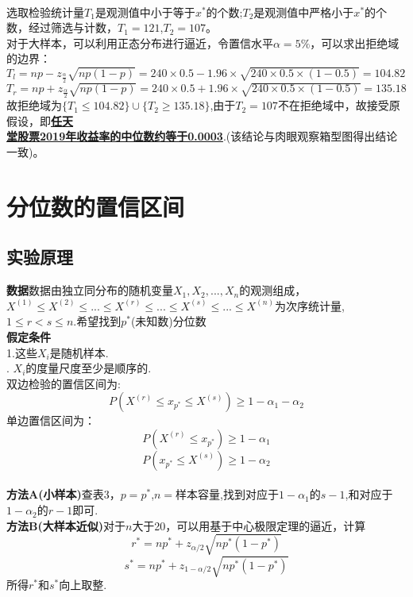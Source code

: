 \documentclass[a4paper, 11pt]{article}
\begin{document}
	\\\indent 选取检验统计量$T_{1}$是观测值中小于等于$x^{*}$的个数;$T_{2}$是观测值中严格小于$x^{*}$的个数，经过筛选与计数，$T_{1}=121$,$T_{2}=107$。
	\\\indent 对于大样本，可以利用正态分布进行逼近，令置信水平$\alpha=5\%$，可以求出拒绝域的边界：
	\\$T_{l}=np-z_{\frac{\alpha}{2}}\sqrt{np(1-p)}=240\times0.5-1.96\times\sqrt{240\times0.5\times(1-0.5)}=104.82$
	\\$T_{r}=np+z_{\frac{\alpha}{2}}\sqrt{np(1-p)}=240\times0.5+1.96\times\sqrt{240\times0.5\times(1-0.5)}=135.18$
	\\故拒绝域为$\{T_{1}\leq 104.82\}\cup\{T_{2}\geq 135.18\}$,由于$T_{2}=107$不在拒绝域中，故接受原假设，即\textbf{\underline{任天}}\\\textbf{\underline{堂股票2019年收益率的中位数约等于0.0003}}.(该结论与肉眼观察箱型图得出结论一致)。
	
	\section{分位数的置信区间}
	\subsection{实验原理}
	\noindent\textbf{数据}\quad 数据由独立同分布的随机变量$X_{1},X_{2},...,X_{n}$的观测组成，$X^{(1)}\leq X^{(2)}\leq ...\leq X^{(r)}\leq ...\leq X^{(s)}\leq ...\leq X^{(n)}$为次序统计量,$1\leq r<s\leq n$.希望找到$p^{*}$(未知数)分位数\\
	\textbf{假定条件}\\
	\indent1.这些$X_{i}$是随机样本.\\
	.\; $X_{i}$的度量尺度至少是顺序的.\\
	双边检验的置信区间为:
	$$P(X^{(r)}\leq x_{p^{*}}\leq X^{(s)})\geq 1-\alpha_{1}-\alpha_{2}$$
	单边置信区间为：
	$$P(X^{(r)}\leq x_{p^{*}})\geq 1-\alpha_{1}$$
	$$P(x_{p^{*}}\leq X^{(s)})\geq 1-\alpha_{2}$$
	\\\textbf{方法A(小样本)}\quad 查表3，$p=p^{*}$,$ n= $样本容量,找到对应于$1-\alpha_{1}$的$s-1$,和对应于$1-\alpha_{2}$的$r-1$即可.
	\\\textbf{方法B(大样本近似)}\quad 对于$ n $大于20，可以用基于中心极限定理的逼近，计算
	$$r^{*}=np^{*}+z_{\alpha/2}\sqrt{np^{*}(1-p^{*})}$$
	$$s^{*}=np^{*}+z_{1-\alpha/2}\sqrt{np^{*}(1-p^{*})}$$
	所得$r^{*}$和$s^{*}$向上取整.
\end{document}

